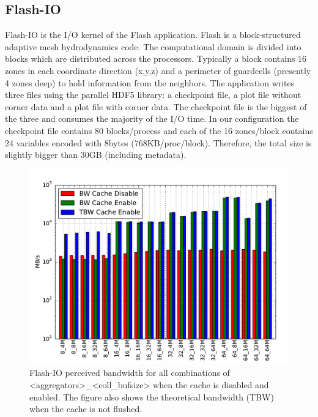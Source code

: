 \subsection{Flash-IO}
\label{subsec: flash}
Flash-IO is the I/O kernel of the Flash application. Flash is a block-structured adaptive mesh hydrodynamics code. The computational domain is divided into blocks which are distributed across the processors. Typically a block contains 16 zones in each coordinate direction (x,y,z) and a perimeter of guardcells (presently 4 zones deep) to hold information from the neighbors. The application writes three files using the parallel HDF5 library: a checkpoint file, a plot file without corner data and a plot file with corner data. The checkpoint file is the biggest of the three and consumes the majority of the I/O time. In our configuration the checkpoint file contains 80 blocks/process and each of the 16 zones/block contains 24 variables encoded with 8bytes (768KB/proc/block). Therefore, the total size is slightly bigger than 30GB (including metadata).
\begin{figure}[htb]
  \centering
  \includegraphics[width=0.9\columnwidth]{figures/flash_32GB_30sec_bw}
  \caption{Flash-IO perceived bandwidth for all combinations of <aggregators>\_<coll\_bufsize> when the cache is disabled and enabled. The figure also shows the theoretical bandwidth (TBW) when the cache is not flushed.}
  \label{figure: flash-bw}
\end{figure}

